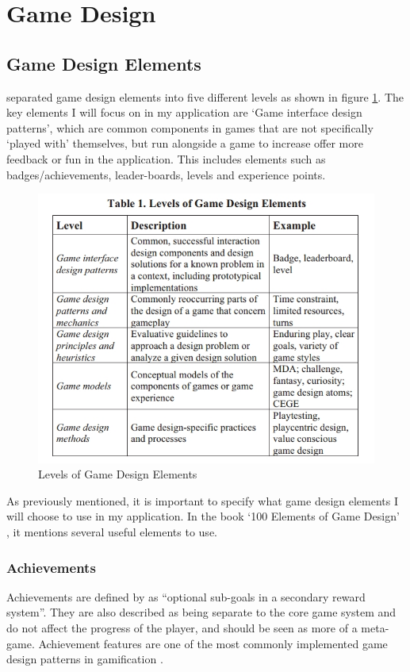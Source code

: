 \section{Game Design}
\subsection{Game Design Elements}
\cite{Deterding:2011:GDE:2181037.2181040} separated game design elements into five different levels as shown in figure \ref{fig:GameDesignElements}. 
The key elements I will focus on in my application are `Game interface design patterns', which are common components in games that are not specifically `played with' themselves, but run alongside a game to increase offer more feedback or fun in the application.
This includes elements such as badges/achievements, leader-boards, levels and experience points.

\begin{figure}[ht]
	\centering
	\includegraphics[scale=0.45]{images/DeterdingsLevelsOfGameDesignElements.jpg}
	\caption{Levels of Game Design Elements}
	\label{fig:GameDesignElements}
\end{figure}

As previously mentioned, it is important to specify what game design elements I will choose to use in my application.
In the book `100 Elements of Game Design' \citep{despain2012100}, it mentions several useful elements to use.

\subsubsection{Achievements}
Achievements are defined by \cite{Montola:2009:AGA:1621841.1621859} as ``optional sub-goals in a secondary reward system''. 
They are also described as being separate to the core game system and do not affect the progress of the player, and should be seen as more of a meta-game. Achievement features are one of the most commonly implemented game design patterns in gamification \citep{hamari2011framework}.

